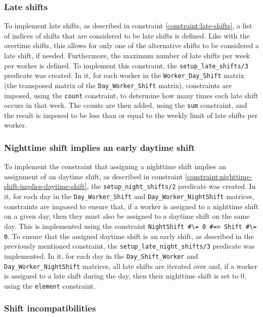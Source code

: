 \documentclass[conference]{IEEEtran}
\begin{document}
\subsubsection*{Late shifts}

To implement late shifts, as described in constraint \ref{constraint:late-shifts}, a list of indices of shifts that are considered to be late shifts is defined. Like with the overtime shifts, this allows for only one of the alternative shifts to be considered a late shift, if needed. Furthermore, the maximum number of late shifts per week per worker is defined.
To implement this constraint, the \texttt{setup\_late\_shifts/3} predicate was created. In it, for each worker in the \texttt{Worker\_Day\_Shift} matrix (the transposed matrix of the \texttt{Day\_Worker\_Shift} matrix), constraints are imposed, using the \texttt{count} constraint, to determine how many times each late shift occurs in that week. The counts are then added, using the \texttt{sum} constraint, and the result is imposed to be less than or equal to the weekly limit of late shifts per worker.

\subsubsection*{Nighttime shift implies an early daytime shift}

To implement the constraint that assigning a nighttime shift implies an assignment of an daytime shift, as described in constraint \ref{constraint:nighttime-shift-implies-daytime-shift}, the \texttt{setup\_night\_shifts/2} predicate was created. In it, for each day in the \texttt{Day\_Worker\_Shift} and \texttt{Day\_Worker\_NightShift} matrices, constraints are imposed to ensure that, if a worker is assigned to a nighttime shift on a given day, then they must also be assigned to a daytime shift on the same day. This is implemented using the constraint \texttt{NightShift \#\textbackslash= 0 \#=> Shift \#\textbackslash= 0}. To ensure that the assigned daytime shift is an early shift, as described in the previously mentioned constraint, the \texttt{setup\_late\_night\_shifts/3} predicate was implemented. In it, for each day in the \texttt{Day\_Shift\_Worker} and \texttt{Day\_Worker\_NightShift} matrices, all late shifts are iterated over and, if a worker is assigned to a late shift during the day, then their nighttime shift is set to 0, using the \texttt{element} constraint.

\subsubsection*{Shift incompatibilities}
\end{document}

